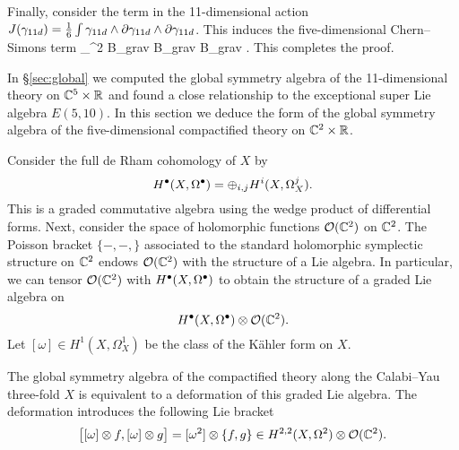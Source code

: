Finally, consider the term in the 11-dimensional action $J(\gamma_{11d}) = \frac16 \int \gamma_{11d} \wedge \partial \gamma_{11d} \wedge \partial \gamma_{11d}$. 
This induces the five-dimensional Chern--Simons term 
\beqn\label{eqn:5dsugra2}
 \int_{\CC^2 \times \RR} B_{grav} \del B_{grav} \del B_{grav} .
\eeqn
This completes the proof. 

\parsec[s:5dglobal]

In \S \ref{sec:global} we computed the global symmetry algebra of the 11-dimensional theory on $\mathbb C^5 \times \mathbb R$ and found a close relationship to the exceptional super Lie algebra $E(5,10)$. 
In this section we deduce the form of the global symmetry algebra of the five-dimensional compactified theory on $\mathbb C^2 \times \mathbb R$. 

Consider the full de Rham cohomology of $X$ by
\[
H^\bullet (X, \Omega^\bullet) = \oplus_{i,j} H^i (X, \Omega^j_X)  .
\]
This is a graded commutative algebra using the wedge product of differential forms. 
Next, consider the space of holomorphic functions $\mathcal O(\mathbb C^2)$ on $\mathbb C^2$. 
The Poisson bracket $\{-,-,\}$ associated to the standard holomorphic symplectic structure on $\mathbb C^2$ endows $\mathcal O(\mathbb C^2)$ with the structure of a Lie algebra. 
In particular, we can tensor $\mathcal O(\mathbb C^2)$ with $H^\bullet (X, \Omega^\bullet)$ to obtain the structure of a graded Lie algebra on 
\[
H^\bullet (X, \Omega^\bullet) \otimes \mathcal O(\mathbb C^2) .
\]
Let $[\omega] \in H^1(X, \Omega^1_X)$ be the class of the K\"ahler form on $X$.

The global symmetry algebra of the compactified theory along the Calabi--Yau three-fold $X$ is equivalent to a deformation of this graded Lie algebra. 
The deformation introduces the following Lie bracket 
\[
\big[ [\omega] \otimes f, [\omega] \otimes g\big] = [\omega^2] \otimes \{f,g\} \in H^{2,2}(X, \Omega^2) \otimes \mathcal O(\mathbb C^2) . 
\]

